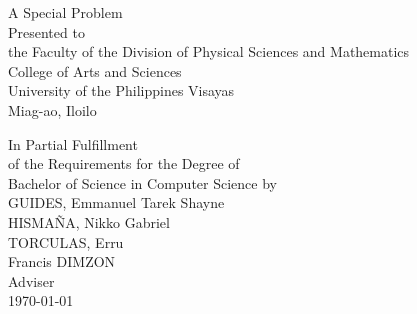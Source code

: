 \begin{titlepage}
\centering


\vspace{1.75cm}
A Special Problem\\
Presented to\\
the Faculty of the Division of Physical Sciences and Mathematics\\
College of Arts and Sciences\\
University of the Philippines Visayas\\
Miag-ao, Iloilo

\vspace{1.75cm}
In Partial Fulfillment\\
of the Requirements for the Degree of\\
Bachelor of Science in Computer Science
\vspace{1.75cm}
by\\

\vspace{1cm}
GUIDES, Emmanuel Tarek Shayne\\
HISMAÑA, Nikko Gabriel \\
TORCULAS, Erru  \\

\vspace{1.75cm}
Francis DIMZON \\
Adviser\\

\vspace{1.75cm}
\today
\end{titlepage}
